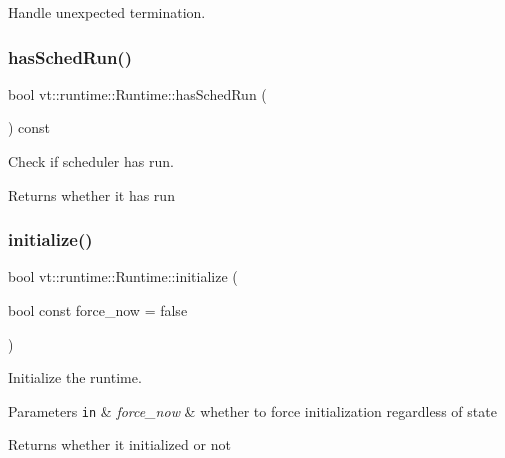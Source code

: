 Handle unexpected termination. 

\mbox{\label{structvt_1_1runtime_1_1_runtime_ae0f66c530a72122874079b52fb259dfb}} 
\subsubsection{\texorpdfstring{has\+Sched\+Run()}{hasSchedRun()}}
{\footnotesize\ttfamily bool vt\+::runtime\+::\+Runtime\+::has\+Sched\+Run (\begin{DoxyParamCaption}{ }\end{DoxyParamCaption}) const}



Check if scheduler has run. 

\begin{DoxyReturn}{Returns}
whether it has run 
\end{DoxyReturn}
\mbox{\label{structvt_1_1runtime_1_1_runtime_a7590edf43fad3a219ef9335a97f4aebb}} 
\subsubsection{\texorpdfstring{initialize()}{initialize()}}
{\footnotesize\ttfamily bool vt\+::runtime\+::\+Runtime\+::initialize (\begin{DoxyParamCaption}\item[{bool const}]{force\+\_\+now = {\ttfamily false} }\end{DoxyParamCaption})}



Initialize the runtime. 


\begin{DoxyParams}[1]{Parameters}
\mbox{\tt in}  & {\em force\+\_\+now} & whether to force initialization regardless of state\\
\hline
\end{DoxyParams}
\begin{DoxyReturn}{Returns}
whether it initialized or not 
\end{DoxyReturn}
\mbox{\label{structvt_1_1runtime_1_1_runtime_a798be8c8813889ef0aacdbc8668d8a41}} 
